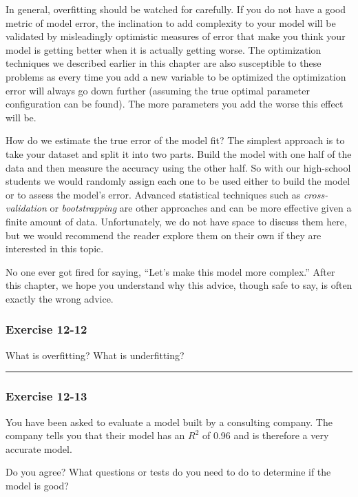 \documentclass[]{memoir}
\begin{document}
In general, overfitting should be watched for carefully. If you do not
have a good metric of model error, the inclination to add complexity to
your model will be validated by misleadingly optimistic measures of
error that make you think your model is getting better when it is
actually getting worse. The optimization techniques we described earlier
in this chapter are also susceptible to these problems as every time you
add a new variable to be optimized the optimization error will always go
down further (assuming the true optimal parameter configuration can be
found). The more parameters you add the worse this effect will be.

How do we estimate the true error of the model fit? The simplest
approach is to take your dataset and split it into two parts. Build the
model with one half of the data and then measure the accuracy using the
other half. So with our high-school students we would randomly assign
each one to be used either to build the model or to assess the model's
error. Advanced statistical techniques such as \emph{cross-validation}
or \emph{bootstrapping} are other approaches and can be more effective
given a finite amount of data. Unfortunately, we do not have space to
discuss them here, but we would recommend the reader explore them on
their own if they are interested in this topic.

No one ever got fired for saying, ``Let's make this model more
complex.'' After this chapter, we hope you understand why this advice,
though safe to say, is often exactly the wrong advice.

\subsubsection{Exercise 12-12}

What is overfitting? What is underfitting?

\begin{center}\rule{3in}{0.4pt}\end{center}

\subsubsection{Exercise 12-13}

You have been asked to evaluate a model built by a consulting company.
The company tells you that their model has an $R^2$ of 0.96 and is
therefore a very accurate model.

Do you agree? What questions or tests do you need to do to determine if
the model is good?
\end{document}
